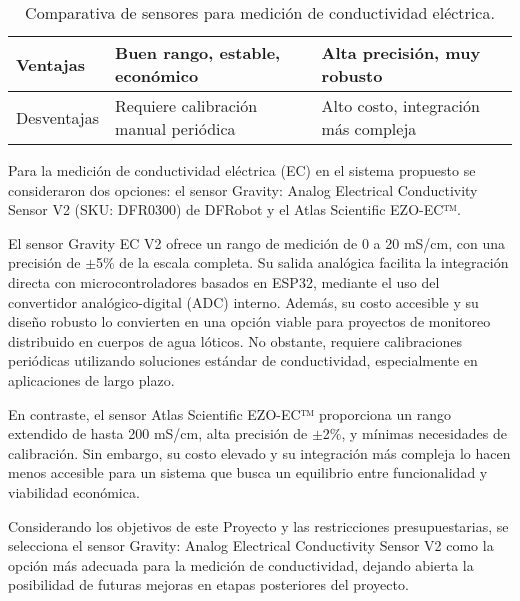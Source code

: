 \begin{table}[H]
\begin{tabular}{
        |p{4cm}    %
        |p{5cm}    %
        |p{5cm}|   %
    }
    Ventajas 
        & Buen rango, estable, económico 
        & Alta precisión, muy robusto \\ 
    \hline
    
    Desventajas 
        & Requiere calibración manual periódica 
        & Alto costo, integración más compleja \\ 
    \hline
    \end{tabular}
    
    \caption{Comparativa de sensores para medición de conductividad eléctrica.}
    \label{tab:sensor_conductividad}
\end{table}

Para la medición de conductividad eléctrica (EC) en el sistema propuesto se consideraron dos opciones: el sensor Gravity: Analog Electrical Conductivity Sensor V2 (SKU: DFR0300) de DFRobot y el Atlas Scientific EZO-EC™.

El sensor Gravity EC V2 ofrece un rango de medición de 0 a 20 mS/cm, con una precisión de $\pm$5\% de la escala completa. Su salida analógica facilita la integración directa con microcontroladores basados en ESP32, mediante el uso del convertidor analógico-digital (ADC) interno. Además, su costo accesible y su diseño robusto lo convierten en una opción viable para proyectos de monitoreo distribuido en cuerpos de agua lóticos. No obstante, requiere calibraciones periódicas utilizando soluciones estándar de conductividad, especialmente en aplicaciones de largo plazo.

En contraste, el sensor Atlas Scientific EZO-EC™ proporciona un rango extendido de hasta 200 mS/cm, alta precisión de $\pm$2\%, y mínimas necesidades de calibración. Sin embargo, su costo elevado y su integración más compleja lo hacen menos accesible para un sistema que busca un equilibrio entre funcionalidad y viabilidad económica.

Considerando los objetivos de este Proyecto y las restricciones presupuestarias, se selecciona el sensor Gravity: Analog Electrical Conductivity Sensor V2 como la opción más adecuada para la medición de conductividad, dejando abierta la posibilidad de futuras mejoras en etapas posteriores del proyecto.

